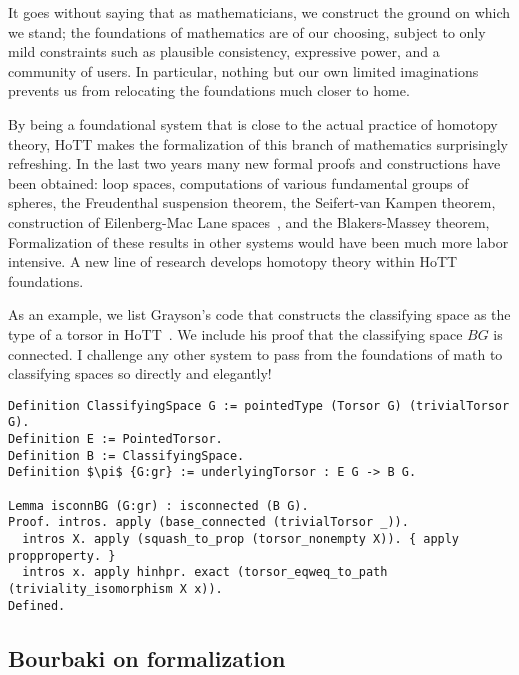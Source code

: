 \documentclass[brochure,english,12pt]{bourbaki}
\theoremstyle{plain}
\begin{document}
It goes without saying that as mathematicians, we construct the ground on which we stand;
the foundations of mathematics are of our choosing, subject
to only mild constraints such as plausible consistency, expressive power, and a community of users.
In particular, nothing but our own limited imaginations prevents us from relocating the
foundations much closer to home.

By being a foundational system that is close to the actual practice of homotopy theory,
HoTT makes the formalization of this branch of mathematics surprisingly refreshing.
In the last two years many new formal proofs and constructions have been obtained: 
loop spaces, computations of various
fundamental groups of spheres, the Freudenthal suspension theorem,
the Seifert-van Kampen theorem,
construction of Eilenberg-Mac Lane spaces~\cite{licataeilenberg}, and the Blakers-Massey theorem,
Formalization of these results in other systems would have been much more labor intensive.
A new line of research develops homotopy theory within HoTT foundations.

As an example, 
 we list Grayson's code that constructs the classifying space as the type of a torsor in HoTT~\cite{Ktheory}.  
We include his proof that the classifying space $BG$ is connected.
I challenge any other system to pass from the foundations of math to classifying spaces so directly and elegantly!


\begin{lstlisting}[keepspaces=true,stringstyle=\tt,basicstyle=\small,frame=single,framesep=8pt,mathescape,morekeywords={Definition,Lemma,Proof,Defined},columns=flexible]
Definition ClassifyingSpace G := pointedType (Torsor G) (trivialTorsor G).
Definition E := PointedTorsor.
Definition B := ClassifyingSpace.
Definition $\pi$ {G:gr} := underlyingTorsor : E G -> B G.

Lemma isconnBG (G:gr) : isconnected (B G).
Proof. intros. apply (base_connected (trivialTorsor _)).
  intros X. apply (squash_to_prop (torsor_nonempty X)). { apply propproperty. }
  intros x. apply hinhpr. exact (torsor_eqweq_to_path (triviality_isomorphism X x)). 
Defined.
\end{lstlisting}





\subsection{Bourbaki on formalization}
\end{document}
